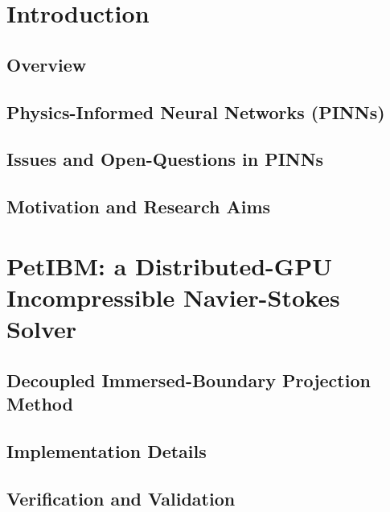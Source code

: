 \documentclass[font=STIX2]{gw-dissertation}[2021/11/19]
\begin{document}
\chapter{Introduction}

    \section{Overview}\label{sec:overview}
    

    \section{Physics-Informed Neural Networks (PINNs)}\label{sec:pinn-review}
    

    \section{Issues and Open-Questions in PINNs}\label{sec:pinn-issues}
    

    \section{Motivation and Research Aims}\label{sec:aims}
    

\chapter{PetIBM: a Distributed-GPU Incompressible Navier-Stokes Solver}\label{chap:petibm}


    \section{Decoupled Immersed-Boundary Projection Method}\label{sec:petibm-math}
    

    \section{Implementation Details}\label{sec:petibm-impl}
    

    \section{Verification and Validation}\label{sec:petibm-vv}
    
\end{document}
